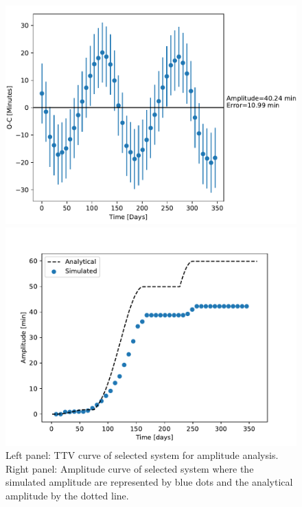 \documentclass[12pt]{report}
\begin{document}
\begin{figure}
\centering
\begin{minipage}{.5\textwidth}
  \centering
  \includegraphics[width=1\linewidth]{img/62_1_new2.pdf}
 

\end{minipage}%
\begin{minipage}{.5\textwidth}
  \centering
  \includegraphics[width=1\linewidth]{img/62_1_new2_amp.pdf}
  

\end{minipage}
\caption{Left panel: TTV curve of selected system for amplitude analysis. Right panel: Amplitude curve of selected system where the simulated amplitude are represented by blue dots and the analytical amplitude by the dotted line.}
\label{fig:ampTime}
\end{figure}
\end{document}
